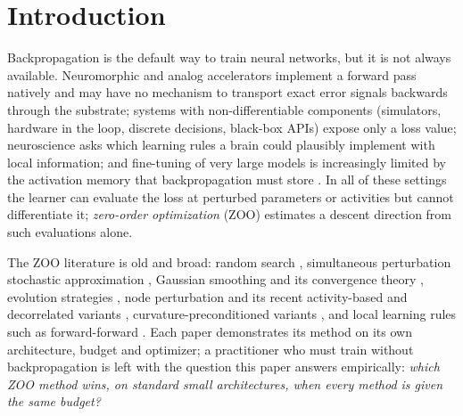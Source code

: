 \documentclass{article}
\begin{document}
\begin{abstract}
path, does better still (2.56 bits per character with one forward pass per step, 2.0 at 400k and
4M, where its gap to backpropagation narrows) but needs a residual network. Curvature preconditioning leaves SPSA unchanged under Adam and does
not help it under SGD; 1.5-ANP is usable on the sequence models where ANP is not, but
its $\alpha=0$ control shows that the curvature weighting is not the ingredient
responsible. At ten and a hundred times the parameter count (one seed) DUST and
1.5-INP stay the two best probe rules (summed loss 4.78 and 5.00 at 400k, 4.91 and 5.08 at 4M,
against 5.38 and 5.52 for INP), the gap to backpropagation widens, and the
step size selected at the small size has to shrink with width. Code and run logs:
\url{https://github.com/Fchaubard/zero_order_optimization_DL_survey}.
\end{abstract}

\section{Introduction}
\label{sec:intro}

Backpropagation \citep{rumelhart1986} is the default way to train neural networks, but
it is not always available. Neuromorphic and analog accelerators implement a forward
pass natively and may have no mechanism to transport exact error signals backwards
through the substrate; systems with non-differentiable components (simulators,
hardware in the loop, discrete decisions, black-box APIs) expose only a loss value;
neuroscience asks which learning rules a brain could plausibly implement with local
information; and fine-tuning of very large models is increasingly limited by the
activation memory that backpropagation must store \citep{malladi2023}. In all of these
settings the learner can evaluate the loss at perturbed parameters or activities but
cannot differentiate it; \emph{zero-order optimization} (ZOO) estimates a descent
direction from such evaluations alone.

The ZOO literature is old and broad: random search \citep{rastrigin1963,matyas1965,
schumer1968}, simultaneous perturbation stochastic approximation
\citep{spall1992,spall1998}, Gaussian smoothing and its convergence theory
\citep{nesterov2017,duchi2015,flaxman2005}, evolution strategies
\citep{wierstra2014,hansen2003,salimans2017,mania2018}, node perturbation
\citep{widrow1990,werfel2003,fiete2006,hiratani2022} and its recent activity-based and
decorrelated variants \citep{dalm2023}, curvature-preconditioned variants
\citep{chaubard2025spsa15,chaubard2025anp15}, and local learning rules such as
forward-forward \citep{hinton2022}. Each paper demonstrates its method on its own architecture, budget and optimizer; a
practitioner who must train without backpropagation is left with the question this
paper answers empirically: \emph{which ZOO method wins, on standard
small architectures, when every method is given the same budget?}
\end{document}
